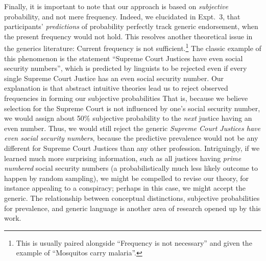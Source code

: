 \documentclass[12pt,letterpaper]{article}
\begin{document}
Finally, it is important to note that our approach is based on \emph{subjective} probability, and not mere frequency.
Indeed, we elucidated in Expt.~3, that participants' \emph{predictions} of probability perfectly track generic endorsement, when the present frequency would not hold.
This resolves another theoretical issue in the generics literature: Current frequency is not sufficient.\footnote{This is usually paired alongside ``Frequency is not necessary'' and given the example of ``Mosquitos carry  malaria''. }
The classic example of this phenomenon is the statement ``Supreme Court Justices have even social security numbers'', which is predicted by linguists to be rejected even if every single Supreme Court Justice has an even social security number.
Our explanation is that abstract intuitive theories lead us to reject observed frequencies in forming our subjective probabilities
That is, because we believe selection for the Supreme Court is not influenced by one's social security number, we would assign about 50\% subjective probability to the \emph{next} justice having an even number.
Thus, we would still reject the generic \emph{Supreme Court Justices have even social security numbers}, because the predictive prevalence would not be any different for Supreme Court Justices than any other profession. 
Intriguingly, if we learned much more surprising information, such as all justices having \emph{prime numbered} social security numbers (a probabilistically much less likely outcome to happen by random sampling), we might be compelled to revise our theory, for instance appealing to a conspiracy; perhaps in this case, we might accept the generic.
The relationship between conceptual distinctions, subjective probabilities for prevalence, and generic language is another area of research opened up by this work. 




%
\end{document}
